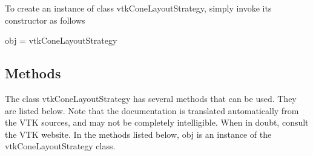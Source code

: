 To create an instance of class vtk\-Cone\-Layout\-Strategy, simply invoke its constructor as follows \begin{DoxyVerb}  obj = vtkConeLayoutStrategy
\end{DoxyVerb}
 \hypertarget{vtkwidgets_vtkxyplotwidget_Methods}{}\subsection{Methods}\label{vtkwidgets_vtkxyplotwidget_Methods}
The class vtk\-Cone\-Layout\-Strategy has several methods that can be used. They are listed below. Note that the documentation is translated automatically from the V\-T\-K sources, and may not be completely intelligible. When in doubt, consult the V\-T\-K website. In the methods listed below, {\ttfamily obj} is an instance of the vtk\-Cone\-Layout\-Strategy class. 
